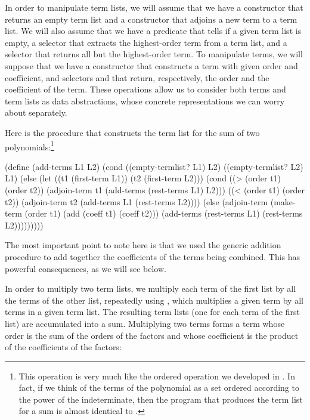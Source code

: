 In order to manipulate term lists, we will assume that we have a constructor
 that returns an empty term list and a constructor
 that adjoins a new term to a term list.  We will also assume
that we have a predicate  that tells if a given term list
is empty, a selector  that extracts the highest-order term
from a term list, and a selector  that returns all but the
highest-order term.  To manipulate terms, we will suppose that we have a
constructor  that constructs a term with given order and
coefficient, and selectors  and  that return,
respectively, the order and the coefficient of the term.  These operations
allow us to consider both terms and term lists as data abstractions, whose
concrete representations we can worry about separately.

Here is the procedure that constructs the term list for the sum of two
polynomials:\footnote{This operation is very much like the ordered
 operation we developed in .  In
fact, if we think of the terms of the polynomial as a set ordered according to
the power of the indeterminate, then the program that produces the term list
for a sum is almost identical to .}

\begin{codeBlock}
(define (add-terms L1 L2)
  (cond ((empty-termlist? L1) L2)
        ((empty-termlist? L2) L1)
        (else
         (let ((t1 (first-term L1))
               (t2 (first-term L2)))
           (cond ((> (order t1) (order t2))
                  (adjoin-term
                   t1 (add-terms (rest-terms L1) L2)))
                 ((< (order t1) (order t2))
                  (adjoin-term
                   t2 (add-terms L1 (rest-terms L2))))
                 (else
                  (adjoin-term
                   (make-term (order t1)
                              (add (coeff t1)
                                   (coeff t2)))
                   (add-terms (rest-terms L1)
                              (rest-terms L2)))))))))
\end{codeBlock}

\noindent
The most important point to note here is that we used the generic addition
procedure  to add together the coefficients of the terms being
combined.  This has powerful consequences, as we will see below.

In order to multiply two term lists, we multiply each term of the first list by
all the terms of the other list, repeatedly using ,
which multiplies a given term by all terms in a given term list.  The resulting
term lists (one for each term of the first list) are accumulated into a sum.
Multiplying two terms forms a term whose order is the sum of the orders of the
factors and whose coefficient is the product of the coefficients of the
factors:

